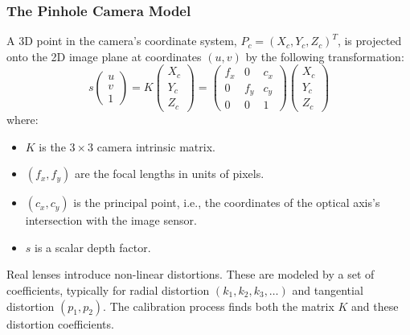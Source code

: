 \documentclass{article}
\begin{document}
\subsubsection{The Pinhole Camera Model}
A 3D point in the camera's coordinate system, $P_c = (X_c, Y_c, Z_c)^T$, is projected onto the 2D image plane at coordinates $(u,v)$ by the following transformation:
\begin{equation}
s \begin{pmatrix} u \\ v \\ 1 \end{pmatrix} = 
K \begin{pmatrix} X_c \\ Y_c \\ Z_c \end{pmatrix} =
\begin{pmatrix} f_x & 0 & c_x \\ 0 & f_y & c_y \\ 0 & 0 & 1 \end{pmatrix}
\begin{pmatrix} X_c \\ Y_c \\ Z_c \end{pmatrix}
\end{equation}
where:
\begin{itemize}
    \item $K$ is the $3 \times 3$ camera intrinsic matrix.
    \item $(f_x, f_y)$ are the focal lengths in units of pixels.
    \item $(c_x, c_y)$ is the principal point, i.e., the coordinates of the optical axis's intersection with the image sensor.
    \item $s$ is a scalar depth factor.
\end{itemize}

Real lenses introduce non-linear distortions. These are modeled by a set of coefficients, typically for radial distortion $(k_1, k_2, k_3, \dots)$ and tangential distortion $(p_1, p_2)$. The calibration process finds both the matrix $K$ and these distortion coefficients.
\end{document}
